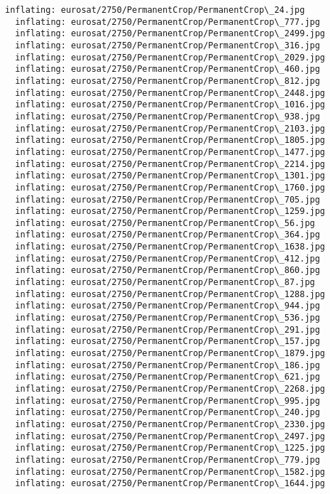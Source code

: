 \documentclass[11pt]{article}
\begin{document}
\begin{Verbatim}[commandchars=\\\{\}]
  inflating: eurosat/2750/PermanentCrop/PermanentCrop\_24.jpg
  inflating: eurosat/2750/PermanentCrop/PermanentCrop\_777.jpg
  inflating: eurosat/2750/PermanentCrop/PermanentCrop\_2499.jpg
  inflating: eurosat/2750/PermanentCrop/PermanentCrop\_316.jpg
  inflating: eurosat/2750/PermanentCrop/PermanentCrop\_2029.jpg
  inflating: eurosat/2750/PermanentCrop/PermanentCrop\_460.jpg
  inflating: eurosat/2750/PermanentCrop/PermanentCrop\_812.jpg
  inflating: eurosat/2750/PermanentCrop/PermanentCrop\_2448.jpg
  inflating: eurosat/2750/PermanentCrop/PermanentCrop\_1016.jpg
  inflating: eurosat/2750/PermanentCrop/PermanentCrop\_938.jpg
  inflating: eurosat/2750/PermanentCrop/PermanentCrop\_2103.jpg
  inflating: eurosat/2750/PermanentCrop/PermanentCrop\_1805.jpg
  inflating: eurosat/2750/PermanentCrop/PermanentCrop\_1477.jpg
  inflating: eurosat/2750/PermanentCrop/PermanentCrop\_2214.jpg
  inflating: eurosat/2750/PermanentCrop/PermanentCrop\_1301.jpg
  inflating: eurosat/2750/PermanentCrop/PermanentCrop\_1760.jpg
  inflating: eurosat/2750/PermanentCrop/PermanentCrop\_705.jpg
  inflating: eurosat/2750/PermanentCrop/PermanentCrop\_1259.jpg
  inflating: eurosat/2750/PermanentCrop/PermanentCrop\_56.jpg
  inflating: eurosat/2750/PermanentCrop/PermanentCrop\_364.jpg
  inflating: eurosat/2750/PermanentCrop/PermanentCrop\_1638.jpg
  inflating: eurosat/2750/PermanentCrop/PermanentCrop\_412.jpg
  inflating: eurosat/2750/PermanentCrop/PermanentCrop\_860.jpg
  inflating: eurosat/2750/PermanentCrop/PermanentCrop\_87.jpg
  inflating: eurosat/2750/PermanentCrop/PermanentCrop\_1288.jpg
  inflating: eurosat/2750/PermanentCrop/PermanentCrop\_944.jpg
  inflating: eurosat/2750/PermanentCrop/PermanentCrop\_536.jpg
  inflating: eurosat/2750/PermanentCrop/PermanentCrop\_291.jpg
  inflating: eurosat/2750/PermanentCrop/PermanentCrop\_157.jpg
  inflating: eurosat/2750/PermanentCrop/PermanentCrop\_1879.jpg
  inflating: eurosat/2750/PermanentCrop/PermanentCrop\_186.jpg
  inflating: eurosat/2750/PermanentCrop/PermanentCrop\_621.jpg
  inflating: eurosat/2750/PermanentCrop/PermanentCrop\_2268.jpg
  inflating: eurosat/2750/PermanentCrop/PermanentCrop\_995.jpg
  inflating: eurosat/2750/PermanentCrop/PermanentCrop\_240.jpg
  inflating: eurosat/2750/PermanentCrop/PermanentCrop\_2330.jpg
  inflating: eurosat/2750/PermanentCrop/PermanentCrop\_2497.jpg
  inflating: eurosat/2750/PermanentCrop/PermanentCrop\_1225.jpg
  inflating: eurosat/2750/PermanentCrop/PermanentCrop\_779.jpg
  inflating: eurosat/2750/PermanentCrop/PermanentCrop\_1582.jpg
  inflating: eurosat/2750/PermanentCrop/PermanentCrop\_1644.jpg

\end{Verbatim}
\end{document}
